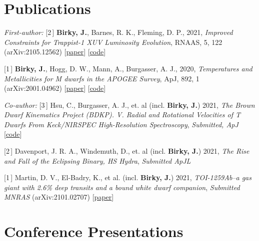 \documentclass[margin,line]{resume}
\newcommand{\nlist}[1]{{\color{gray} [#1\,]}}
\begin{document}
\begin{resume}
\section{\mysidestyle \textcolor{bcolor}{Publications}}

\textsl{First-author:} \vspace{.2cm} \newline
\nlist{2} \textbf{Birky, J.}, Barnes, R. K., Fleming, D. P., 2021, \textsl{Improved Constraints for Trappist-1 XUV Luminosity Evolution}, RNAAS, 5, 122 (arXiv:2105.12562)  [\href{https://iopscience.iop.org/article/10.3847/2515-5172/ac034c}{paper}] [\href{https://github.com/jbirky/trappist_xuv}{code}]

\nlist{1} \textbf{Birky, J.}, Hogg, D. W., Mann, A., Burgasser, A. J., 2020, \textsl{Temperatures and Metallicities for M dwarfs in the APOGEE Survey}, ApJ, 892, 1 (arXiv:2001.04962) [\href{https://iopscience.iop.org/article/10.3847/1538-4357/ab7004}{paper}] [\href{https://github.com/jbirky/Mdwarf_project}{code}]

\textsl{Co-author:} \vspace{.2cm} \newline
\nlist{3} Hsu, C., Burgasser, A. J., et. al (incl. \textbf{Birky, J.}) 2021, \textsl{The Brown Dwarf Kinematics Project (BDKP). V. Radial and Rotational Velocities of T Dwarfs From Keck/NIRSPEC High-Resolution Spectroscopy}, \textit{Submitted, ApJ} [\href{https://github.com/chihchunhsu/smart}{code}]

\nlist{2} Davenport, J. R. A., Windemuth, D., et. al (incl. \textbf{Birky, J.}) 2021, \textsl{The Rise and Fall of the Eclipsing Binary, HS Hydra}, \textit{Submitted ApJL}

\nlist{1} Martin, D. V., El-Badry, K., et al. (incl. \textbf{Birky, J.}) 2021, \textsl{TOI-1259Ab--a gas giant with 2.6\% deep transits and a bound white dwarf companion}, \textit{Submitted MNRAS} (arXiv:2101.02707) [\href{https://arxiv.org/abs/2101.02707}{paper}]

\newpage


\section{\mysidestyle \textcolor{bcolor}{Conference Presentations}}


\end{resume}
\end{document}
